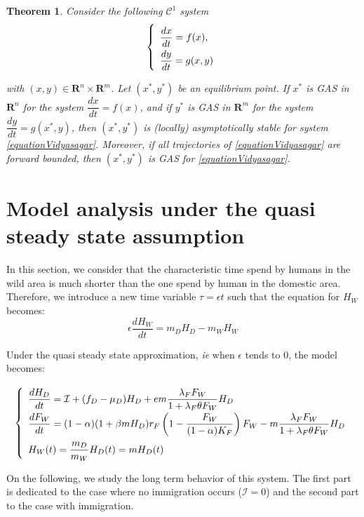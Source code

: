 \documentclass{article}
\newcommand{\lfw}{\lambda_{F}}
\newcommand{\lfw}{\lambda_{F}}
\newcommand{\cI}{\mathcal{I}}
\newtheorem{theorem}{Theorem}
\begin{document}
\begin{theorem}\label{theoremVidyasagar} \cite{vidyasagar_decomposition_1980, dumont_mathematical_2012}
Consider the following $\mathcal{C}^1$ system
\begin{equation}
\def\arraystretch{2}
\left\{ \begin{array}{l}
\dfrac{dx}{dt} = f(x), \\
\dfrac{dy}{dt} = g(x, y) 
\end{array} \right.
\label{equationVidyasagar}
\end{equation}

with $(x, y) \in \mathbf{R}^n \times\mathbf{R}^m$. Let $(x^*, y^*)$ be an equilibrium point.
If $x^*$ is GAS in $\mathbf{R}^n$ for the system $\dfrac{dx}{dt} = f(x)$, and if $y^*$ is GAS in $\mathbf{R}^m$ for the system $\dfrac{dy}{dt} = g(x^*, y)$, then $(x^*, y^*)$ is (locally) asymptotically stable for system \eqref{equationVidyasagar}. Moreover, if all trajectories of \eqref{equationVidyasagar} are forward bounded, then $(x^*, y^*)$ is GAS for \eqref{equationVidyasagar}.
\end{theorem}


\section{Model analysis under the quasi steady state assumption}
In this section, we consider that the characteristic time spend by humans in the wild area is much shorter than the one spend by human in the domestic area. Therefore, we introduce a new time variable $\tau = \epsilon t$ such that the equation for $H_W$ becomes:
$$
\epsilon \dfrac{dH_W}{dt} = m_DH_D - m_W H_W
$$

Under the quasi steady state approximation, \textit{ie} when $\epsilon$ tends to $0$, the model becomes:

\begin{equation}
\def\arraystretch{2}
\left\lbrace \begin{array}{l}
\dfrac{dH_D}{dt} = \cI + (f_D - \mu_D) H_D + e m \dfrac{\lfw F_W}{1 + \lfw \theta F_W}H_D \\
\dfrac{dF_W}{dt} = (1-\alpha) (1+\beta m H_D) r_F \left(1 - \dfrac{F_W}{(1-\alpha)K_F} \right) F_W - m \dfrac{\lfw F_W}{1 + \lfw \theta F_W} H_D \\
H_W(t) = \dfrac{m_D}{m_W} H_D(t) = m H_D(t)
\end{array} \right.
\label{QSSA}
\end{equation}

On the following, we study the long term behavior of this system. The first part is dedicated to the case where no immigration occurs ($\cI = 0$) and the second part to the case with immigration.
\end{document}

